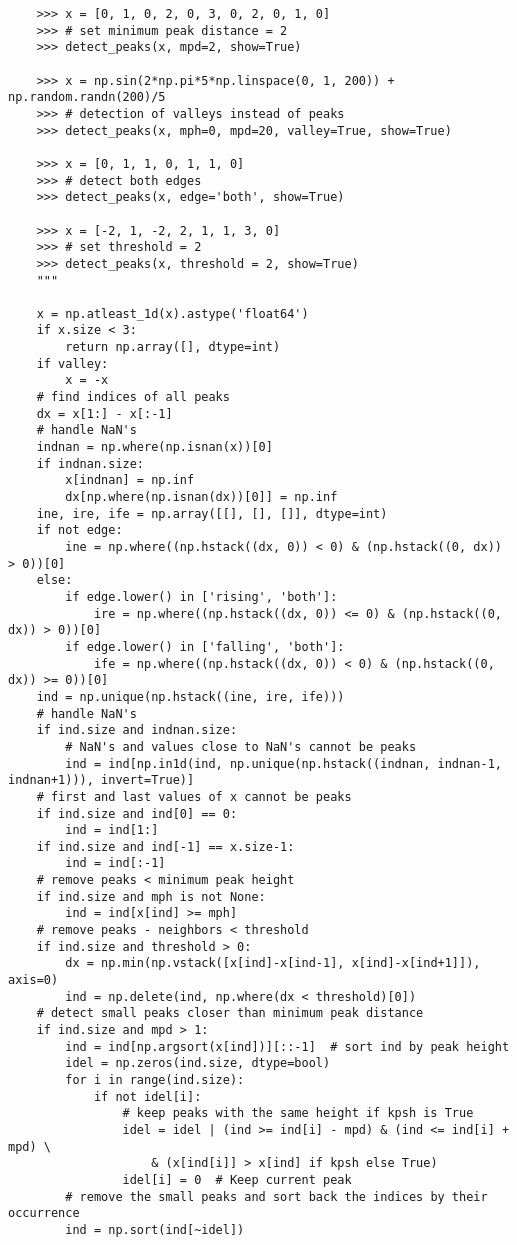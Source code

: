 \documentclass[]{article}
\begin{document}
\begin{verbatim}
    >>> x = [0, 1, 0, 2, 0, 3, 0, 2, 0, 1, 0]
    >>> # set minimum peak distance = 2
    >>> detect_peaks(x, mpd=2, show=True)

    >>> x = np.sin(2*np.pi*5*np.linspace(0, 1, 200)) + np.random.randn(200)/5
    >>> # detection of valleys instead of peaks
    >>> detect_peaks(x, mph=0, mpd=20, valley=True, show=True)

    >>> x = [0, 1, 1, 0, 1, 1, 0]
    >>> # detect both edges
    >>> detect_peaks(x, edge='both', show=True)

    >>> x = [-2, 1, -2, 2, 1, 1, 3, 0]
    >>> # set threshold = 2
    >>> detect_peaks(x, threshold = 2, show=True)
    """

    x = np.atleast_1d(x).astype('float64')
    if x.size < 3:
        return np.array([], dtype=int)
    if valley:
        x = -x
    # find indices of all peaks
    dx = x[1:] - x[:-1]
    # handle NaN's
    indnan = np.where(np.isnan(x))[0]
    if indnan.size:
        x[indnan] = np.inf
        dx[np.where(np.isnan(dx))[0]] = np.inf
    ine, ire, ife = np.array([[], [], []], dtype=int)
    if not edge:
        ine = np.where((np.hstack((dx, 0)) < 0) & (np.hstack((0, dx)) > 0))[0]
    else:
        if edge.lower() in ['rising', 'both']:
            ire = np.where((np.hstack((dx, 0)) <= 0) & (np.hstack((0, dx)) > 0))[0]
        if edge.lower() in ['falling', 'both']:
            ife = np.where((np.hstack((dx, 0)) < 0) & (np.hstack((0, dx)) >= 0))[0]
    ind = np.unique(np.hstack((ine, ire, ife)))
    # handle NaN's
    if ind.size and indnan.size:
        # NaN's and values close to NaN's cannot be peaks
        ind = ind[np.in1d(ind, np.unique(np.hstack((indnan, indnan-1, indnan+1))), invert=True)]
    # first and last values of x cannot be peaks
    if ind.size and ind[0] == 0:
        ind = ind[1:]
    if ind.size and ind[-1] == x.size-1:
        ind = ind[:-1]
    # remove peaks < minimum peak height
    if ind.size and mph is not None:
        ind = ind[x[ind] >= mph]
    # remove peaks - neighbors < threshold
    if ind.size and threshold > 0:
        dx = np.min(np.vstack([x[ind]-x[ind-1], x[ind]-x[ind+1]]), axis=0)
        ind = np.delete(ind, np.where(dx < threshold)[0])
    # detect small peaks closer than minimum peak distance
    if ind.size and mpd > 1:
        ind = ind[np.argsort(x[ind])][::-1]  # sort ind by peak height
        idel = np.zeros(ind.size, dtype=bool)
        for i in range(ind.size):
            if not idel[i]:
                # keep peaks with the same height if kpsh is True
                idel = idel | (ind >= ind[i] - mpd) & (ind <= ind[i] + mpd) \
                    & (x[ind[i]] > x[ind] if kpsh else True)
                idel[i] = 0  # Keep current peak
        # remove the small peaks and sort back the indices by their occurrence
        ind = np.sort(ind[~idel])


\end{verbatim}
\end{document}
